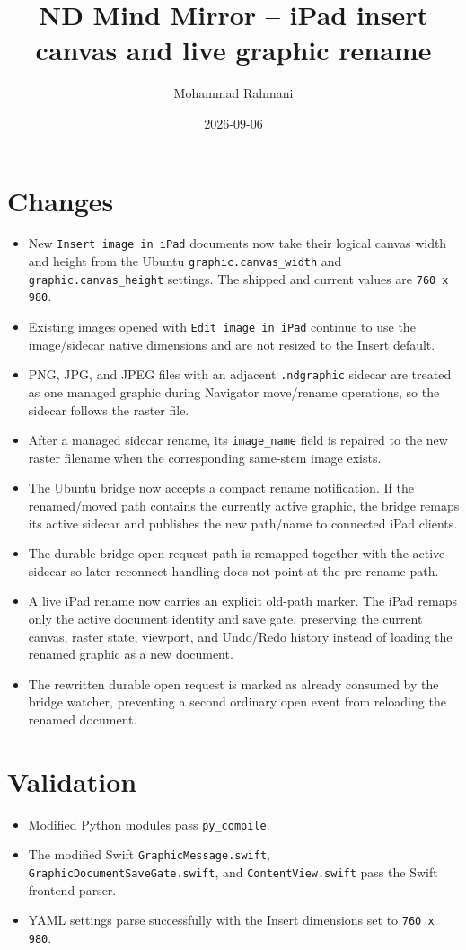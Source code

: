\documentclass[a4paper]{article}
\title{ND Mind Mirror -- iPad insert canvas and live graphic rename}
\date{2026-09-06}
\author{Mohammad Rahmani}
\begin{document}
   \maketitle

   \section{Changes}
   \begin{itemize}
      \item New \texttt{Insert image in iPad} documents now take their logical canvas width and height from the Ubuntu \texttt{graphic.canvas\_width} and \texttt{graphic.canvas\_height} settings. The shipped and current values are \texttt{760 x 980}.
      \item Existing images opened with \texttt{Edit image in iPad} continue to use the image/sidecar native dimensions and are not resized to the Insert default.
      \item PNG, JPG, and JPEG files with an adjacent \texttt{.ndgraphic} sidecar are treated as one managed graphic during Navigator move/rename operations, so the sidecar follows the raster file.
      \item After a managed sidecar rename, its \texttt{image\_name} field is repaired to the new raster filename when the corresponding same-stem image exists.
      \item The Ubuntu bridge now accepts a compact rename notification. If the renamed/moved path contains the currently active graphic, the bridge remaps its active sidecar and publishes the new path/name to connected iPad clients.
      \item The durable bridge open-request path is remapped together with the active sidecar so later reconnect handling does not point at the pre-rename path.
      \item A live iPad rename now carries an explicit old-path marker. The iPad remaps only the active document identity and save gate, preserving the current canvas, raster state, viewport, and Undo/Redo history instead of loading the renamed graphic as a new document.
      \item The rewritten durable open request is marked as already consumed by the bridge watcher, preventing a second ordinary open event from reloading the renamed document.
   \end{itemize}

   \section{Validation}
   \begin{itemize}
      \item Modified Python modules pass \texttt{py\_compile}.
      \item The modified Swift \texttt{GraphicMessage.swift}, \texttt{GraphicDocumentSaveGate.swift}, and \texttt{ContentView.swift} pass the Swift frontend parser.
      \item YAML settings parse successfully with the Insert dimensions set to \texttt{760 x 980}.
   \end{itemize}

   
   
\end{document}
